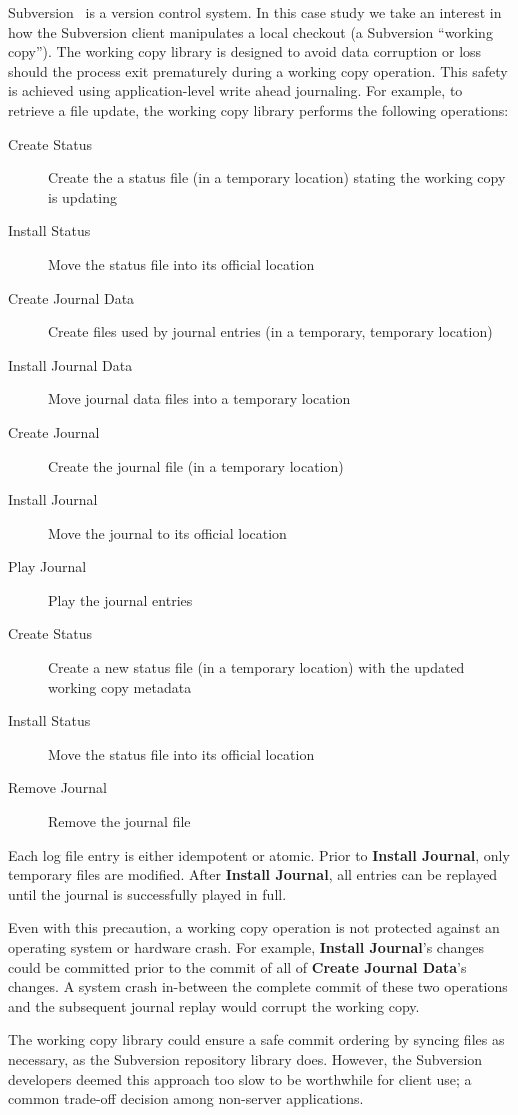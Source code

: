 Subversion~\cite{svn} is a version control system.
%
In this case study we take an interest in how the Subversion client
manipulates a local checkout (a Subversion ``working copy'').
%
The working copy library is designed to avoid data corruption or loss
should the process exit prematurely during a working copy operation.
%
This safety is achieved using application-level write ahead
journaling.
%
For example, to retrieve a file update, the working copy library
performs the following operations:
%
\begin{description}
\item[Create Status] Create the a status file (in a temporary location)
  stating the working copy is updating
\item[Install Status] Move the status file into its official location
\item[Create Journal Data] Create files used by journal entries (in a
  temporary, temporary location)
\item[Install Journal Data] Move journal data files into a temporary
  location
\item[Create Journal] Create the journal file (in a temporary location)
\item[Install Journal] Move the journal to its official location
\item[Play Journal] Play the journal entries
\item[Create Status] Create a new status file (in a temporary location)
  with the updated working copy metadata
\item[Install Status] Move the status file into its official location
\item[Remove Journal] Remove the journal file
\end{description}
%
Each log file entry is either idempotent or atomic.
%
Prior to \textbf{Install Journal}, only temporary files are modified.
After \textbf{Install Journal}, all entries can be replayed until the
journal is successfully played in full.

Even with this precaution, a working copy operation is not protected
against an operating system or hardware crash.
%
For example, \textbf{Install Journal}'s changes could be committed
prior to the commit of all of \textbf{Create Journal Data}'s changes.
%
A system crash in-between the complete commit of these two operations
and the subsequent journal replay would corrupt the working copy.

The working copy library could ensure a safe commit ordering by
syncing files as necessary, as the Subversion repository library does.
%
However, the Subversion developers deemed this approach too slow to be
worthwhile for client use; a common trade-off decision among non-server
applications.

